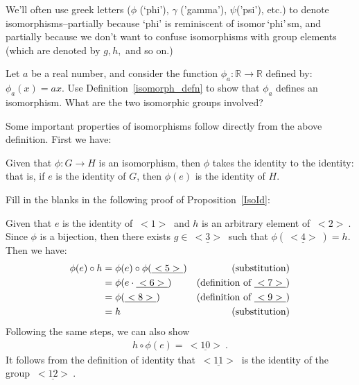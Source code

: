 \begin{rem}
We'll often use greek letters ($\phi$ (`phi'), $\gamma$ ('gamma'), $\psi$('psi'), etc.) to denote isomorphisms--partially because `phi' is reminiscent of isomor$\,$`phi'$\,$sm, and partially because we don't want to confuse isomorphisms with group elements  (which are denoted by $g,h,$ and so on.)
\end{rem}

\begin{exercise}{}
Let $a$ be a real number, and consider the function $\phi_a : \mathbb{R} \rightarrow \mathbb{R}$ defined by:  $\phi_a(x) = ax$.  Use Definition~\ref{isomorph_defn} to show that $\phi_a$ defines an isomorphism. What are the two isomorphic groups involved?
\end{exercise}

Some important properties of isomorphisms follow directly from the above definition. First we have:

\begin{thm}\label{IsoId}
Given that  $\phi : G \rightarrow H$ is an  isomorphism, then $\phi$ takes the identity to the identity: that is, if $e$ is the identity of $G$, then  $\phi(e)$ is the identity of $H$.
\end{thm}

\begin{exercise}{}
Fill in the blanks in the following proof of Proposition~\ref{IsoId}:
\medskip

\noindent
Given that $e$ is the identity of \underline{$~<1>~$} and $h$ is an arbitrary element of \underline{$~<2>~$}.  Since $\phi$ is a bijection, then there exists $g \in \underline{~<3>~}$ such that $\phi(\underline{~<4>~}) = h$.  Then  we have:
\begin{align*}
\phi(e) \circ h &= \phi(e) \circ \phi(\underline{~<5>~}) & \textrm{(substitution)}\\
&= \phi( e \cdot \underline{~<6>~}) & \textrm{(definition of~} \underline{~<7>~})\\
&= \phi( \underline{~<8>~}) & \textrm{(definition of \underline{$~<9>~$})}\\
&= h & \textrm{(substitution)}
\end{align*}
Following the same steps, we can also show
\begin{align*}
h \circ \phi(e) = \underline{~<10>~}.
\end{align*}
It follows from the definition of identity that $\underline{~<11>~}$ is the identity of the group $\underline{~<12>~}$.
\end{exercise}



